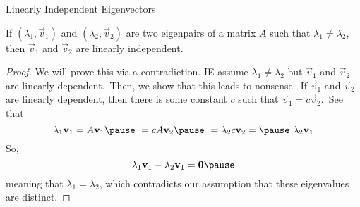 \documentclass[xcoler=dvipsnames, aspectratio=169]{beamer}
\begin{document}
    \begin{frame}{Linearly Independent Eigenvectors}
        \small
        \begin{theorem}
            If $(\lambda_1, \vec{v}_1)$ and $(\lambda_2,\vec{v}_2)$ are two eigenpairs of a matrix
            $A$ such that $\lambda_1\neq\lambda_2$, then $\vec{v}_1$ and $\vec{v}_2$ are linearly
            independent.
        \end{theorem}\pause
        \begin{proof}
            We will prove this via a contradiction. IE assume $\lambda_1\neq\lambda_2$ but 
            $\vec{v}_1$ and $\vec{v}_2$ are linearly dependent.\pause\ Then, we show that this 
            leads to nonsense.\pause\ If $\vec{v}_1$ and $\vec{v}_2$ are linearly dependent, 
            then there is some constant $c$ such that $\vec{v}_1=c\vec{v}_2$.\pause\ See that
            \[
                \lambda_1\vec{v}_1 = A\vec{v}_1\pause\ = cA\vec{v}_2\pause\ 
                = \lambda_2 c\vec{v}_2 =\pause\ \lambda_2\vec{v}_1
            \]
            So, 
            \[
                \lambda_1\vec{v}_1-\lambda_2\vec{v}_1 = \vec{0}\pause
            \]
            meaning that $\lambda_1=\lambda_2$, which contradicts our assumption that these eigenvalues
            are distinct.
        \end{proof}
    \end{frame}
\end{document}
